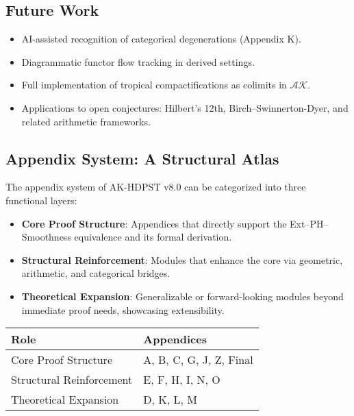 \documentclass[11pt]{article}
\begin{document}
\subsection*{Future Work}
\begin{itemize}
    \item AI-assisted recognition of categorical degenerations (Appendix K).
    \item Diagrammatic functor flow tracking in derived settings.
    \item Full implementation of tropical compactifications as colimits in \( \mathcal{AK} \).
    \item Applications to open conjectures: Hilbert’s 12th, Birch–Swinnerton-Dyer, and related arithmetic frameworks.
\end{itemize}

\subsection*{Appendix System: A Structural Atlas}

The appendix system of AK-HDPST v8.0 can be categorized into three functional layers:

\begin{itemize}
  \item \textbf{Core Proof Structure}: Appendices that directly support the Ext–PH–Smoothness equivalence and its formal derivation.
  \item \textbf{Structural Reinforcement}: Modules that enhance the core via geometric, arithmetic, and categorical bridges.
  \item \textbf{Theoretical Expansion}: Generalizable or forward-looking modules beyond immediate proof needs, showcasing extensibility.
\end{itemize}

\vspace{1em}

\begin{center}
\renewcommand{\arraystretch}{1.2}
\begin{tabular}{ll}
\toprule
\textbf{Role} & \textbf{Appendices} \\
\midrule
Core Proof Structure & A, B, C, G, J, Z, Final \\
Structural Reinforcement & E, F, H, I, N, O \\
Theoretical Expansion & D, K, L, M \\
\bottomrule
\end{tabular}
\end{center}
\end{document}
